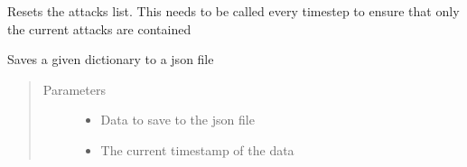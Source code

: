 \documentclass[letterpaper,10pt,english]{sphinxmanual}
\begin{document}
\begin{fulllineitems}
\begin{fulllineitems}
\begin{quote}
\begin{description}
\end{description}\end{quote}

\end{fulllineitems}


\begin{fulllineitems}
\label{\detokenize{source/yawning_titan.envs.generic.core:yawning_titan.envs.generic.core.network_interface.NetworkInterface.reset_stored_attacks}}
\sphinxAtStartPar
Resets the attacks list. This needs to be called every timestep to ensure that only the current attacks are
contained

\end{fulllineitems}


\begin{fulllineitems}
\label{\detokenize{source/yawning_titan.envs.generic.core:yawning_titan.envs.generic.core.network_interface.NetworkInterface.save_json}}
\sphinxAtStartPar
Saves a given dictionary to a json file
\begin{quote}\begin{description}
\item[{Parameters}] \leavevmode\begin{itemize}
\item {}
\sphinxAtStartPar
{} \textendash{} Data to save to the json file

\item {}
\sphinxAtStartPar
{} \textendash{} The current timestamp of the data

\end{itemize}

\end{description}\end{quote}


\end{fulllineitems}
\end{fulllineitems}
\end{document}
